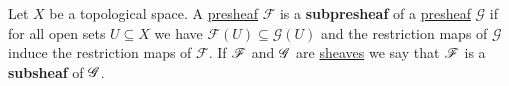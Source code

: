 \documentclass[../../main]{subfiles}
\begin{document}
\begin{definition}\label{def:types-of-morphisms-pre-sheaves}
  Let \(X\) be a topological space.
  A \hyperref[def:presheaf]{presheaf} \(\mathcal{F}\) is a \textbf{subpresheaf} of a \hyperref[def:presheaf]{presheaf} \(\mathcal{G}\) if for all open sets \(U \subseteq X\) we have \(\mathcal{F}(U) \subseteq \mathcal{G}(U)\) and the restriction maps of \(\mathcal{G}\) induce the restriction maps of \(\mathcal{F}\).
  If \(\mathscr{F}\) and \(\mathscr{G}\) are \hyperref[def:sheaf]{sheaves} we say that \(\mathscr{F}\) is a \textbf{subsheaf} of \(\mathscr{G}\).
\end{definition}
\end{document}
